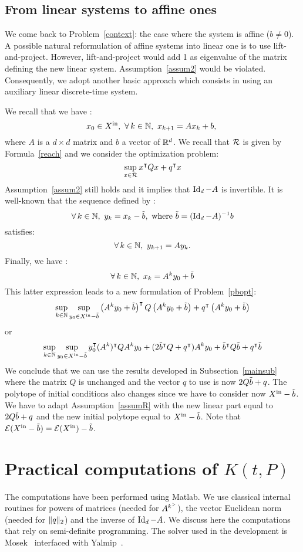 \documentclass[10pt]{llncs}
\begin{document}
\subsection{From linear systems to affine ones}
\label{affine}
We come back to Problem~\eqref{context}: the case where the system is affine ($b\neq 0$).
A possible natural reformulation of affine systems into linear one is to use lift-and-project. However, lift-and-project would add 1 as eigenvalue of the matrix defining the new linear system. Assumption~\ref{assum2} would be violated.  Consequently, we adopt another basic approach which consists in using an auxiliary linear discrete-time system.   

 We recall that we have :
\[
x_0\in \xin,\ \forall\, k\in\nn,\ x_{k+1}=A x_k+b,\
\]
where $A$ is a $d\times d$ matrix and $b$ a vector of $\mathbb R^d$. We recall that $\mathcal{R}$ is given by Formula~\eqref{reach} and we consider the optimization problem:
\[
\sup_{x\in\mathcal{R}} x^\intercal Q x+q^\intercal x
\]
Assumption~\ref{assum2} still holds and it implies that $\operatorname{Id}_d-A$ is invertible. It is well-known that the sequence defined by :
\[
\forall\, k\in\mathbb{N},\ y_k=x_k-\tilde{b},\text{ where } \tilde{b}=(\operatorname{Id}_d-A)^{-1} b
\]
satisfies:
\[
\forall\, k\in\mathbb{N},\ y_{k+1}=A y_k. 
\]
Finally, we have :
\[
\forall\, k\in\nn,\ x_k=A^k y_0+\btilde
\]
This latter expression leads to a new formulation of Problem~\eqref{pbopt}: 
\[
\sup_{k\in\mathbb{N}} \sup_{y_0\in X^\mathrm{in}-\tilde{b}} \left(A^k y_0+\tilde{b}\right)^\intercal Q  \left(A^k y_0+\tilde{b}\right)+q^\intercal  \left(A^k y_0+\tilde{b}\right)
\]
or
\[
\sup_{k\in\mathbb{N}} \sup_{y_0\in X^\mathrm{in}-\tilde{b}} y_0^\intercal (A^k)^\intercal Q  A^k y_0+(2\tilde{b}^\intercal Q+q^\intercal) A^k y_0 +\tilde{b}^\intercal Q \tilde{b}+q^\intercal \tilde{b}
\]
We conclude that we can use the results developed in Subsection~\ref{mainsub} where the matrix $Q$ is unchanged and the vector $q$ to use is now $2Q\tilde{b}+q$. The polytope of initial conditions also changes since we have to consider now $X^\mathrm{in}-\tilde{b}$. We have to adapt Assumption~\ref{assumR} with the new linear part equal to $2Q\tilde{b}+q$ and the new initial polytope equal to $X^\mathrm{in}-\tilde{b}$. Note that $\mathcal{E}(X^\mathrm{in}-\tilde{b})=\mathcal{E}(X^\mathrm{in})-\tilde{b}$.

\section{Practical computations of $K(t,P)$}
\label{computations}
The computations have been performed using Matlab. We use classical internal routines for powers of matrices (needed for $A^{k^{>}}$), the vector Euclidean norm (needed for $\| q\|_2$) and the inverse of $\operatorname{Id}_d-A$. We discuss here the computations that rely on semi-definite programming. The solver used in the development is Mosek~\cite{andersen2000mosek} interfaced with Yalmip~\cite{Lofberg2004}. 
\end{document}
